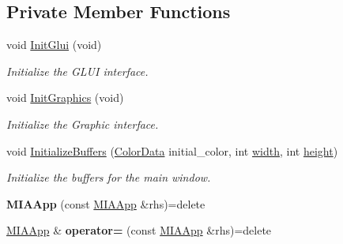 \subsection*{Private Member Functions}
\begin{DoxyCompactItemize}
\item 
void \hyperlink{classimage__tools_1_1MIAApp_a73dda8b4bfb9f31c8a267774dfecdeaa}{Init\+Glui} (void)\hypertarget{classimage__tools_1_1MIAApp_a73dda8b4bfb9f31c8a267774dfecdeaa}{}\label{classimage__tools_1_1MIAApp_a73dda8b4bfb9f31c8a267774dfecdeaa}

\begin{DoxyCompactList}\small\item\em Initialize the G\+L\+UI interface. \end{DoxyCompactList}\item 
void \hyperlink{classimage__tools_1_1MIAApp_a3d0f36c690bcd1f3eb85c2f92da6a5b3}{Init\+Graphics} (void)\hypertarget{classimage__tools_1_1MIAApp_a3d0f36c690bcd1f3eb85c2f92da6a5b3}{}\label{classimage__tools_1_1MIAApp_a3d0f36c690bcd1f3eb85c2f92da6a5b3}

\begin{DoxyCompactList}\small\item\em Initialize the Graphic interface. \end{DoxyCompactList}\item 
void \hyperlink{classimage__tools_1_1MIAApp_a712453910e5325d90d7d0835ac00d059}{Initialize\+Buffers} (\hyperlink{classimage__tools_1_1ColorData}{Color\+Data} initial\+\_\+color, int \hyperlink{classimage__tools_1_1BaseGfxApp_a2fe403c5392f624477c2ce4429f1a7b5}{width}, int \hyperlink{classimage__tools_1_1BaseGfxApp_aa961e13a7a8e6062204223cc33ac7503}{height})\hypertarget{classimage__tools_1_1MIAApp_a712453910e5325d90d7d0835ac00d059}{}\label{classimage__tools_1_1MIAApp_a712453910e5325d90d7d0835ac00d059}

\begin{DoxyCompactList}\small\item\em Initialize the buffers for the main window. \end{DoxyCompactList}\item 
{\bfseries M\+I\+A\+App} (const \hyperlink{classimage__tools_1_1MIAApp}{M\+I\+A\+App} \&rhs)=delete\hypertarget{classimage__tools_1_1MIAApp_a5ae3748b77cc55a1100083b02b088927}{}\label{classimage__tools_1_1MIAApp_a5ae3748b77cc55a1100083b02b088927}

\item 
\hyperlink{classimage__tools_1_1MIAApp}{M\+I\+A\+App} \& {\bfseries operator=} (const \hyperlink{classimage__tools_1_1MIAApp}{M\+I\+A\+App} \&rhs)=delete\hypertarget{classimage__tools_1_1MIAApp_a067b980221f818a3a42d11f516d666f0}{}\label{classimage__tools_1_1MIAApp_a067b980221f818a3a42d11f516d666f0}

\end{DoxyCompactItemize}
